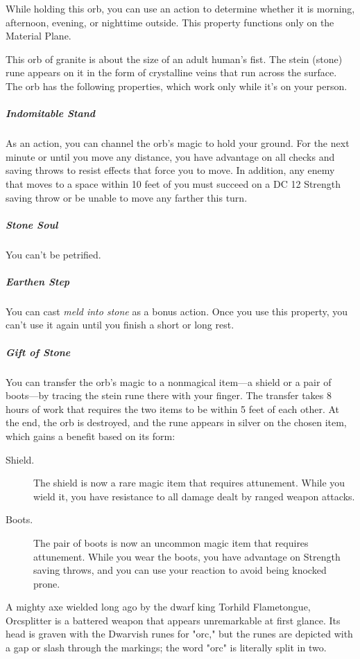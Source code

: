 \documentclass[10pt,a4paper,twoside,bg=print,twocolumn,openany,nodeprecatedcode]{dndbook}
\begin{document}
While holding this orb, you can use an action to determine whether it is morning, afternoon, evening, or nighttime outside. This property functions only on the Material Plane.

This orb of granite is about the size of an adult human's fist. The stein (stone) rune appears on it in the form of crystalline veins that run across the surface. The orb has the following properties, which work only while it's on your person.

\subparagraph{Indomitable Stand}
As an action, you can channel the orb's magic to hold your ground. For the next minute or until you move any distance, you have advantage on all checks and saving throws to resist effects that force you to move. In addition, any enemy that moves to a space within 10 feet of you must succeed on a DC 12 Strength saving throw or be unable to move any farther this turn.

\subparagraph{Stone Soul}
You can't be petrified.

\subparagraph{Earthen Step}
You can cast \textit{meld into stone} as a bonus action. Once you use this property, you can't use it again until you finish a short or long rest.

\subparagraph{Gift of Stone}
You can transfer the orb's magic to a nonmagical item—a shield or a pair of boots—by tracing the stein rune there with your finger. The transfer takes 8 hours of work that requires the two items to be within 5 feet of each other. At the end, the orb is destroyed, and the rune appears in silver on the chosen item, which gains a benefit based on its form:


\begin{description}
\item[Shield.]
The shield is now a rare magic item that requires attunement. While you wield it, you have resistance to all damage dealt by ranged weapon attacks.
\item[Boots.]
The pair of boots is now an uncommon magic item that requires attunement. While you wear the boots, you have advantage on Strength saving throws, and you can use your reaction to avoid being knocked prone.
\end{description}

A mighty axe wielded long ago by the dwarf king Torhild Flametongue, Orcsplitter is a battered weapon that appears unremarkable at first glance. Its head is graven with the Dwarvish runes for "orc," but the runes are depicted with a gap or slash through the markings; the word "orc" is literally split in two.
\end{document}
